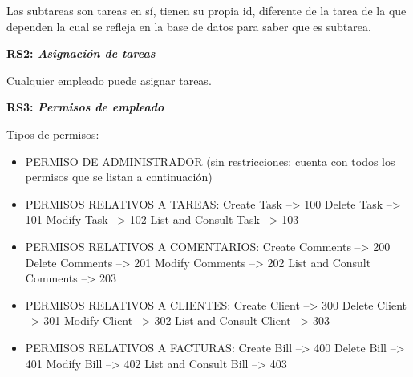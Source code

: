 \documentclass[paper=a4, fontsize=11pt, spanish]{scrartcl}
\begin{document}
Las subtareas son tareas en sí, tienen su propia id, diferente de la tarea de la que dependen la cual se refleja en la base de datos para saber que es subtarea.

\setlength{\parindent}{0em}
\textbf{RS2: \textit{Asignación de tareas}}
\setlength{\parindent}{2em}

Cualquier empleado puede asignar tareas.

\setlength{\parindent}{0em}
\textbf{RS3: \textit{Permisos de empleado}}
\setlength{\parindent}{2em}

Tipos de permisos:
\begin{itemize}
\item PERMISO DE ADMINISTRADOR (sin restricciones: cuenta con todos los permisos que se listan a continuación)

\item PERMISOS RELATIVOS A TAREAS:
\newline	Create Task               --> 100
\newline	Delete Task               --> 101
\newline	Modify Task               --> 102
\newline	List and Consult Task     --> 103

\item PERMISOS RELATIVOS A COMENTARIOS:
\newline    Create Comments           --> 200
\newline    Delete Comments           --> 201
\newline    Modify Comments           --> 202
\newline    List and Consult Comments --> 203

\item PERMISOS RELATIVOS A CLIENTES:
\newline    Create Client             --> 300
\newline    Delete Client             --> 301
\newline    Modify Client             --> 302
\newline    List and Consult Client   --> 303

\item PERMISOS RELATIVOS A FACTURAS:
\newline    Create Bill               --> 400
\newline    Delete Bill               --> 401
\newline    Modify Bill               --> 402
\newline    List and Consult Bill     --> 403
    

\end{itemize}
\end{document}
